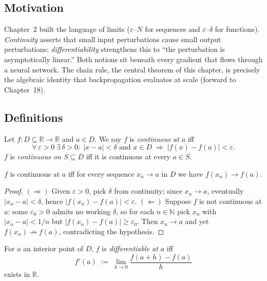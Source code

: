 \subsection*{Motivation}

Chapter~2 built the language of limits ($\varepsilon$--$N$ for sequences and $\varepsilon$--$\delta$ for functions). \emph{Continuity} asserts that small input perturbations cause small output perturbations; \emph{differentiability} strengthens this to ``the perturbation is asymptotically linear.'' Both notions sit beneath every gradient that flows through a neural network. The chain rule, the central theorem of this chapter, is precisely the algebraic identity that backpropagation evaluates at scale (forward to Chapter~18).

\subsection*{Definitions}

\begin{definition}
Let $f:D\subseteq\mathbb{R}\to\mathbb{R}$ and $a\in D$. We say $f$ is \emph{continuous at $a$} iff
\[
\forall\,\varepsilon>0\;\exists\,\delta>0:\;|x-a|<\delta\text{ and }x\in D\;\Longrightarrow\;|f(x)-f(a)|<\varepsilon.
\]
$f$ is \emph{continuous on $S\subseteq D$} iff it is continuous at every $a\in S$.
\end{definition}

\begin{proposition}\label{prop:seq}
$f$ is continuous at $a$ iff for every sequence $x_n\to a$ in $D$ we have $f(x_n)\to f(a)$.
\end{proposition}

\begin{proof}
$(\Rightarrow)$ Given $\varepsilon>0$, pick $\delta$ from continuity; since $x_n\to a$, eventually $|x_n-a|<\delta$, hence $|f(x_n)-f(a)|<\varepsilon$. $(\Leftarrow)$ Suppose $f$ is not continuous at $a$: some $\varepsilon_0>0$ admits no working $\delta$, so for each $n\in\mathbb{N}$ pick $x_n$ with $|x_n-a|<1/n$ but $|f(x_n)-f(a)|\ge\varepsilon_0$. Then $x_n\to a$ and yet $f(x_n)\not\to f(a)$, contradicting the hypothesis.
\end{proof}

\begin{definition}[Differentiability]
For $a$ an interior point of $D$, $f$ is \emph{differentiable at $a$} iff
\[
f'(a)\;:=\;\lim_{h\to 0}\frac{f(a+h)-f(a)}{h}
\]
exists in $\mathbb{R}$.
\end{definition}

